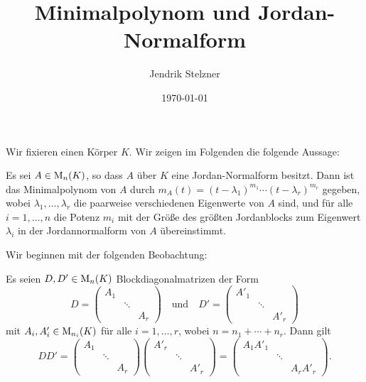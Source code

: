 \documentclass[a4paper,10pt]{scrartcl}
\title{Minimalpolynom und Jordan-Normalform}
\author{Jendrik Stelzner}
\date{\today}
\begin{document}
\maketitle

Wir fixieren einen Körper $K$.
Wir zeigen im Folgenden die folgende Aussage:

\begin{theorem}
  \label{theorem: minimalpolynomial}
  Es sei $A \in \operatorname{M}_{n}(K)$, so dass $A$ über $K$ eine Jordan-Normalform besitzt.
  Dann ist das Minimalpolynom von $A$ durch $m_A(t) = (t - \lambda_1)^{m_1} \dotsm (t - \lambda_r)^{m_r}$ gegeben, wobei $\lambda_1, \dotsc, \lambda_r$ die paarweise verschiedenen Eigenwerte von $A$ sind, und für alle $i = 1, \dotsc, n$ die Potenz $m_i$ mit der Größe des größten Jordanblocks zum Eigenwert $\lambda_i$ in der Jordannormalform von $A$ übereinstimmt.
\end{theorem}

Wir beginnen mit der folgenden Beobachtung:

\begin{lemma}
  \label{lemma: multiplication of block diagonal matrices}
  Es seien $D, D' \in \operatorname{M}_{n}(K)$ Blockdiagonalmatrizen der Form
  \[
      D
    = \begin{pmatrix}
        A_1 &         &       \\
            & \ddots  &       \\
            &         & A_r
      \end{pmatrix}
    \quad\text{und}\quad
      D'
    = \begin{pmatrix}
        A'_1  &         &       \\
              & \ddots  &       \\
              &         & A'_r
      \end{pmatrix}
  \]
  mit $A_i, A_i' \in \operatorname{M}_{n_i}(K)$ für alle $i = 1, \dotsc, r$, wobei $n = n_1 + \dotsb + n_r$.
  Dann gilt
  \[
      D D'
    = \begin{pmatrix}
        A_1 &         &     \\
            & \ddots  &     \\
            &         & A_r
      \end{pmatrix}
      \begin{pmatrix}
        A'_r  &         &       \\
              & \ddots  &       \\
              &         & A'_r
      \end{pmatrix}
    = \begin{pmatrix}
        A_1 A'_1  &         &           \\
                  & \ddots  &           \\
                  &         & A_r A'_r
      \end{pmatrix}.
  \]
\end{lemma}
\end{document}
